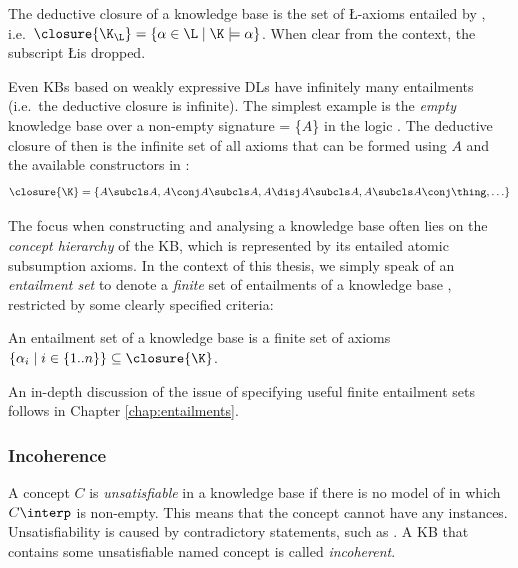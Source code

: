 \begin{defn}
The deductive closure \closure{\K_{\L}} of a knowledge base \K is the set of \L-axioms entailed by \K, i.e.\  $\closure{\K_{\L}} = \{ \alpha \in \L \mid \K \models \alpha \}$. When clear from the context, the subscript \L is dropped.
\end{defn}

Even KBs based on weakly expressive DLs have infinitely many entailments (i.e.\ the deductive closure is infinite). The simplest example is the \emph{empty} knowledge base \K over a non-empty signature \sig{\K} = \{$A$\} in the logic . The deductive closure of \K then is the infinite set of all axioms that can be formed using $A$ and the available constructors in :
\begin{align*}
\closure{\K} = \{ A \subcls A, A \conj A \subcls A, A \disj A \subcls A, A \subcls A \conj \thing, \ldots \}
\end{align*}

The focus when constructing and analysing a knowledge base often lies on the \emph{concept hierarchy} of the KB, which is represented by its entailed atomic subsumption axioms. In the context of this thesis, we simply speak of an \emph{entailment set} to denote a \emph{finite} set of entailments of a knowledge base \K, restricted by some clearly specified criteria:
\begin{defn}
An entailment set \entsetk of a knowledge base \K is a finite set of axioms $\{ \alpha_{i} \mid i \in \{1 .. n \} \} \subseteq \closure{\K}$.
\end{defn}

An in-depth discussion of the issue of specifying useful finite entailment sets follows in Chapter \ref{chap:entailments}.

\subsubsection{Incoherence}
A concept $C$ is \emph{unsatisfiable} in a knowledge base \K if there is no model \I of \K in which $C\interp$ is non-empty. This means that the concept cannot have any instances. Unsatisfiability is caused by contradictory statements, such as . A KB that contains some unsatisfiable named concept is called \emph{incoherent}. 

